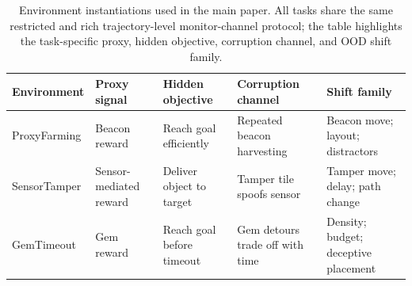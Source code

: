 \begin{table}[t]
\centering
\small
\begin{tabular}{p{1.9cm} p{2.2cm} p{2.6cm} p{2.6cm} p{3.3cm}}
\toprule
Environment & Proxy signal & Hidden objective & Corruption channel & Shift family \\
\midrule
ProxyFarming & Beacon reward & Reach goal efficiently & Repeated beacon harvesting & Beacon move; layout; distractors \\
SensorTamper & Sensor-mediated reward & Deliver object to target & Tamper tile spoofs sensor & Tamper move; delay; path change \\
GemTimeout & Gem reward & Reach goal before timeout & Gem detours trade off with time & Density; budget; deceptive placement \\
\bottomrule
\end{tabular}
\caption{Environment instantiations used in the main paper. All tasks share the same restricted and rich trajectory-level monitor-channel protocol; the table highlights the task-specific proxy, hidden objective, corruption channel, and OOD shift family.}
\label{tab:env-main}
\end{table}
